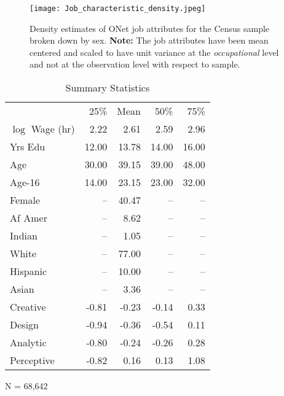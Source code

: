 \documentclass[12pt]{article}
\theoremstyle{definition}
\begin{document}
\begin{figure}[ht!]
  \texttt{[image: Job\_characteristic\_density.jpeg]}
  \caption{Density estimates of ONet job attributes for the Census sample broken down by
  sex. \textbf{Note:} The job attributes have been mean centered and scaled to
  have unit variance at the \textit{occupational} level and not at the observation
  level with respect to sample.}
  \label{fig:JobChar_vs_sex}
\end{figure}


\begin{table} \centering
  \caption{Summary Statistics}
  \begin{threeparttable}
    \begin{tabular}[l]{l r r r r}
  \cmidrule{1-5}

                   & 25\%   & Mean & 50\% & 75\%    \\
  \cmidrule{1-5}
  $\log$ Wage (hr) &  2.22 &  2.61 &  2.59  &  2.96 \\
  Yrs Edu          & 12.00 & 13.78 & 14.00  & 16.00 \\
  Age              & 30.00 & 39.15 & 39.00  & 48.00 \\
  Age-16           & 14.00 & 23.15 & 23.00  & 32.00 \\
  Female           & --    & 40.47 & --     & --    \\
  Af Amer          & --    &  8.62 & --     & --    \\
  Indian           & --    &  1.05 & --     & --    \\
  White            & --    & 77.00 & --     & --    \\
  Hispanic         & --    & 10.00 & --     & --    \\
  Asian            & --    &  3.36 & --     & --    \\
  Creative         & -0.81 & -0.23 & -0.14  &  0.33 \\
  Design           & -0.94 & -0.36 & -0.54  &  0.11 \\
  Analytic         & -0.80 & -0.24 & -0.26  &  0.28 \\
  Perceptive       & -0.82 &  0.16 &  0.13  &  1.08 \\

  \hline
    \end{tabular}
    \begin{tablenotes}
      \item{\footnotesize N = 68,642}
    \end{tablenotes} \label{tbl:census_cov_summary}
  \end{threeparttable}
\end{table}
\end{document}
